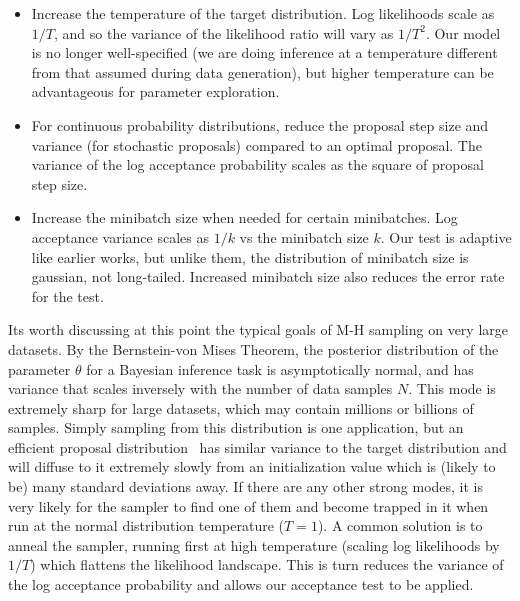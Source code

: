 \documentclass{article}
\begin{document}
\begin{itemize}
  
\item Increase the temperature of the target distribution. Log likelihoods
  scale as $1/T$, and so the variance of the likelihood ratio will
  vary as $1/T^2$. Our model is no longer well-specified (we are doing inference
  at a temperature different from that assumed during data generation), but
  higher temperature can be advantageous for parameter exploration.

\item For continuous probability distributions, reduce the proposal
  step size and variance (for stochastic proposals) compared to an optimal
  proposal. The variance of the log acceptance probability scales as the
  square of proposal step size. 

\item Increase the minibatch size when needed for certain
  minibatches. Log acceptance variance scales as $1/k$ vs the
  minibatch size $k$. Our test is adaptive like earlier works, but
  unlike them, the distribution of minibatch size is gaussian, not
  long-tailed.  Increased minibatch size also reduces the error rate
  for the test.


\end{itemize}

Its worth discussing at this point the typical goals of
M-H sampling on very large datasets.  By the Bernstein-von Mises
Theorem, the posterior distribution of the parameter $\theta$ for a
Bayesian inference task is asymptotically normal, and has variance
that scales inversely with the number of data samples $N$. This mode
is extremely sharp for large datasets, which may contain millions or
billions of samples. Simply sampling from this distribution is one
application, but an efficient proposal distribution~\cite{OptimalScaling01} has similar variance to the target
distribution and will diffuse to it extremely slowly from an
initialization value which is (likely to be) many standard deviations
away. If there are any other strong modes, it is very likely for the
sampler to find one of them and become trapped in it when run at the
normal distribution temperature ($T=1$). A common solution is to anneal
the sampler, running first at high temperature (scaling log
likelihoods by $1/T$) which flattens the likelihood landscape.  This is
turn reduces the variance of the log acceptance probability and allows
our acceptance test to be applied.
\end{document}
